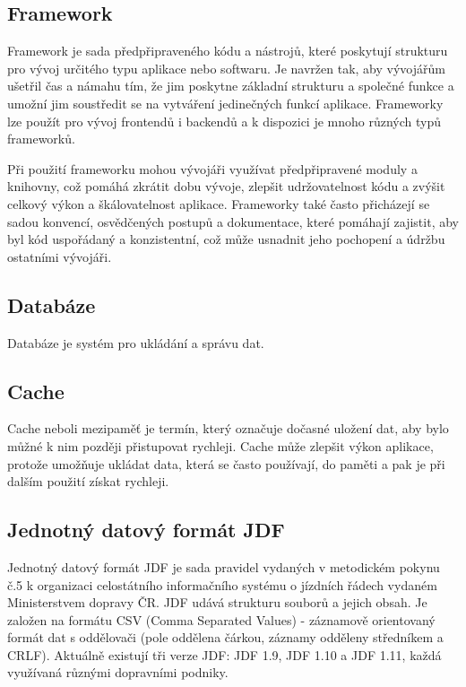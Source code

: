 \subsection{Framework}
Framework je sada předpřipraveného kódu a nástrojů, které poskytují strukturu pro vývoj určitého typu aplikace nebo softwaru. Je navržen tak, aby vývojářům ušetřil čas a námahu tím, že jim poskytne základní strukturu a společné funkce a umožní jim soustředit se na vytváření jedinečných funkcí aplikace. Frameworky lze použít pro vývoj frontendů i backendů a k dispozici je mnoho různých typů frameworků. \par
Při použití frameworku mohou vývojáři využívat předpřipravené moduly a knihovny, což pomáhá zkrátit dobu vývoje, zlepšit udržovatelnost kódu a zvýšit celkový výkon a škálovatelnost aplikace. Frameworky také často přicházejí se sadou konvencí, osvědčených postupů a dokumentace, které pomáhají zajistit, aby byl kód uspořádaný a konzistentní, což může usnadnit jeho pochopení a údržbu ostatními vývojáři.
\subsection{Databáze}
Databáze je systém pro ukládání a správu dat.
\subsection{Cache}\label{cache}
Cache neboli mezipaměť je termín, který označuje dočasné uložení dat, aby bylo můžné k nim později přistupovat rychleji. Cache může zlepšit výkon aplikace, protože umožňuje ukládat data, která se často používají, do paměti a pak je při dalším použití získat rychleji. \par
\subsection[JDF]{Jednotný datový formát JDF}\label{JDF}
Jednotný datový formát JDF je sada pravidel vydaných v metodickém pokynu č.5 k organizaci celostátního informačního systému o jízdních řádech vydaném Ministerstvem dopravy ČR. JDF udává strukturu souborů a jejich obsah. Je založen na formátu CSV (Comma Separated Values) - záznamově orientovaný formát dat s oddělovači (pole oddělena čárkou, záznamy odděleny středníkem a CRLF). Aktuálně existují tři verze JDF: JDF 1.9, JDF 1.10 a JDF 1.11, každá využívaná různými dopravními podniky. \par